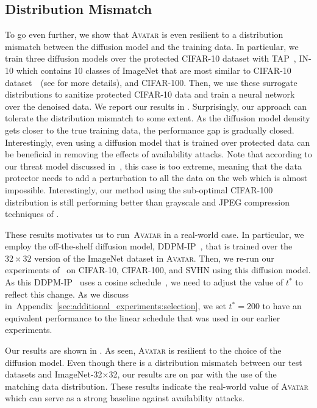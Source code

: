 \documentclass[conference]{IEEEtran}
\theoremstyle{definition}
\theoremstyle{remark}
\theoremstyle{proposition}
\begin{document}
\subsection{Distribution Mismatch}\label{sec:sec:mismatch}
To go even further, we show that \textsc{Avatar} is even resilient to a distribution mismatch between the diffusion model and the training data.
In particular, we train three diffusion models over the protected CIFAR-10 dataset with TAP~\citep{fowl2021tap}, IN-10 which contains 10 classes of ImageNet that are most similar to CIFAR-10 dataset~\citep{huang2021emn}~(see  for more details), and CIFAR-100.
Then, we use these surrogate distributions to sanitize protected CIFAR-10 data and train a neural network over the denoised data.
We report our results in .
Surprisingly, our approach can tolerate the distribution mismatch to some extent.
As the diffusion model density gets closer to the true training data, the performance gap is gradually closed.
Interestingly, even using a diffusion model that is trained over protected data can be beneficial in removing the effects of availability attacks.
Note that according to our threat model discussed in~, this case is too extreme, meaning that the data protector needs to add a perturbation to all the data on the web which is almost impossible.
Interestingly, our method using the sub-optimal CIFAR-100 distribution is still performing better than grayscale and JPEG compression techniques of \citet{liu2023image}.

These results motivates us to run~\textsc{Avatar} in a real-world case.
In particular, we employ the off-the-shelf diffusion model, DDPM-IP~\citep{ning2023ddpmip}, that is trained over the $32 \times 32$ version of the ImageNet dataset in \textsc{Avatar}.
Then, we re-run our experiments of~ on CIFAR-10, CIFAR-100, and SVHN using this diffusion model.
As this DDPM-IP~\citep{ning2023ddpmip} uses a cosine schedule~\citep{dhariwal2021diffusion}, we need to adjust the value of $t^{*}$ to reflect this change.
As we discuss in~Appendix~\ref{sec:additional_experiments:selection}, we set $t^{*}=200$ to have an equivalent performance to the linear schedule that was used in our earlier experiments.


Our results are shown in .
As seen, \textsc{Avatar} is resilient to the choice of the diffusion model.
Even though there is a distribution mismatch between our test datasets and ImageNet-32$\times$32, our results are on par with the use of the matching data distribution.
These results indicate the real-world value of \textsc{Avatar} which can serve as a strong baseline against availability attacks.
\end{document}
